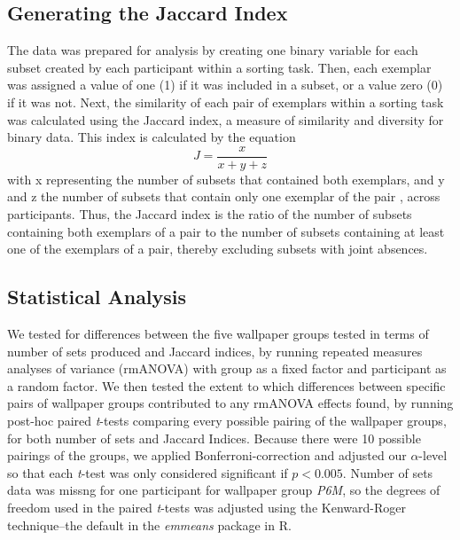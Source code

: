 \documentclass[11pt, twoside]{article}
\begin{document}
\subsection*{Generating the Jaccard Index}
The data was prepared for analysis by creating one binary variable for each subset created by each participant within a sorting task. Then, each exemplar was assigned a value of one (1) if it was included in a subset, or a value zero (0) if it was not. Next, the similarity of each pair of exemplars within a sorting task was calculated using the Jaccard index, a measure of similarity and diversity for binary data. This index is calculated by the equation  \[ J = \frac{x}{x + y + z} \] with x representing the number of subsets that contained both exemplars, and y and z the number of subsets that contain only one exemplar of the pair \citep{capra_factor_2005}, across participants. Thus, the Jaccard index is the ratio of the number of subsets containing both exemplars of a pair to the number of subsets containing at least one of the exemplars of a pair, thereby excluding subsets with joint absences.

\subsection*{Statistical Analysis}
We tested for differences between the five wallpaper groups tested in terms of number of sets produced and Jaccard indices, by running repeated measures analyses of variance (rmANOVA) with group as a fixed factor and participant as a random factor. We then tested the extent to which differences between specific pairs of wallpaper groups contributed to any rmANOVA effects found, by running post-hoc paired \textit{t}-tests comparing every possible pairing of the wallpaper groups, for both number of sets and Jaccard Indices. Because there were 10 possible pairings of the groups, we applied Bonferroni-correction and adjusted our $\alpha$-level so that each \textit{t}-test was only considered significant if $p < 0.005$. Number of sets data was missng for one participant for wallpaper group \textit{P6M}, so the degrees of freedom used in the paired \textit{t}-tests was adjusted using the Kenward-Roger technique--the default in the \textit{emmeans} package in R.
\end{document}
